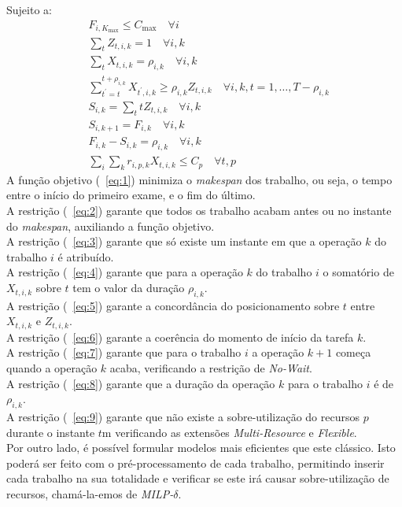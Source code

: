 Sujeito a:
\begin{align}
&F_{i,K_{\max}} \leq C_{\max} \quad \forall i \label{eq:2} \\
&\sum_{t}Z_{t,i,k} = 1 \quad \forall i,k \label{eq:3} \\
&\sum_{t}X_{t,i,k} = \rho_{i,k} \quad \forall i,k \label{eq:4} \\
&\sum^{t+\rho_{i,k}}_{t^{'}=t}X_{t^{'},i,k} \geq \rho_{i,k}Z_{t,i,k} \quad \forall i,k,t=1, \ldots,T-\rho_{i,k} \label{eq:5} \\
&S_{i,k} = \sum_{t}tZ_{t,i,k} \quad \forall i,k \label{eq:6} \\
&S_{i,k+1} = F_{i,k} \quad \forall i,k \label{eq:7} \\
&F_{i,k} - S_{i,k} = \rho_{i,k} \quad \forall i,k \label{eq:8} \\
&\sum_{i}\sum_{k}r_{i,p,k}X_{t,i,k} \leq C_{p} \quad \forall t,p \label{eq:9} 
\end{align}
A função objetivo (~\ref{eq:1}) minimiza o \textit{makespan} dos trabalho, ou seja, o tempo entre o início do primeiro exame, e o fim do último.\\
A restrição (~\ref{eq:2}) garante que todos os trabalho acabam antes ou no instante do \textit{makespan}, auxiliando a função objetivo.\\
A restrição (~\ref{eq:3}) garante que só existe um instante em que a operação $k$ do trabalho $i$ é atribuído.\\
A restrição (~\ref{eq:4}) garante que para a operação $k$ do trabalho $i$ o somatório de $X_{t,i,k}$ sobre $t$ tem o valor da duração $\rho_{i,k}$. \\
A restrição (~\ref{eq:5}) garante a concordância do posicionamento sobre $t$ entre $X_{t,i,k}$ e $Z_{t,i,k}$. \\
A restrição (~\ref{eq:6}) garante a coerência do momento de início da tarefa $k$.\\
A restrição (~\ref{eq:7}) garante que para o trabalho $i$ a operação $k+1$ começa quando a operação $k$ acaba, verificando a restrição de \textit{No-Wait}. \\
A restrição (~\ref{eq:8}) garante que a duração da operação $k$ para o trabalho $i$ é de $\rho_{i,k}$.\\
A restrição (~\ref{eq:9}) garante que não existe a sobre-utilização do recursos $p$ durante o instante $t$m verificando as extensões \textit{Multi-Resource} e \textit{Flexible}.\\

Por outro lado, é possível formular modelos mais eficientes que este clássico. Isto poderá ser feito com o pré-processamento de cada trabalho, permitindo inserir cada trabalho na sua totalidade e verificar se este irá causar sobre-utilização de recursos, chamá-la-emos de \textit{MILP-$\delta$}.\\

